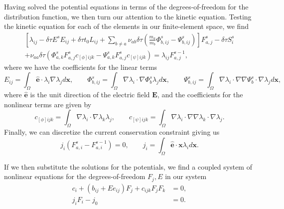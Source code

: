 \documentclass[preprint]{revtex4}
\begin{document}
Having solved the potential equations in terms of the degrees-of-freedom for the distribution function, we then turn our attention to the kinetic equation. Testing the kinetic equation for each of the elements in our finite-element space, we find 
\begin{multline}
\left[\lambda_{ij}-\delta\tau E^sE_{ij}+\delta\tau t_0L_{ij}+\sum_{b\neq a}\nu_{ab}\delta\tau\left(\frac{m_a}{m_b}\Phi^s_{b,ij}-\Psi^s_{b,ij}\right)\right]F^s_{a,j}-\delta\tau S^s_i\\+\nu_{aa}\delta\tau\left(\Phi^s_{a,k}F^s_{a,j}c_{[\phi]ijk}-\Psi^s_{a,k}F^s_{a,j}c_{[\psi]ijk}\right)=\lambda_{ij}F^{s-1}_{a,j},
\end{multline}
where we have the coefficients for the linear terms
\begin{equation}
E_{ij}=\int_\Omega\bm{\hat{e}}\cdot\lambda_i\nabla\lambda_jd\bm{x},\qquad \Phi^s_{b,ij}=\int_\Omega\nabla\lambda_i\cdot\nabla\Phi^s_{b}\lambda_jd\bm{x},\qquad \Psi^s_{b,ij}=\int_\Omega\nabla\lambda_i\cdot\nabla\nabla\Psi^s_{b}\cdot\nabla\lambda_jd\bm{x},
\end{equation}
where $\bm{\hat{e}}$ is the unit direction of the electric field $\bm{E}$, and the coefficients for the nonlinear terms are given by
\begin{equation}
c_{[\phi]ijk}=\int_\Omega\nabla\lambda_i\cdot\nabla\lambda_k\lambda_j,\qquad c_{[\psi]ijk}=\int_\Omega\nabla\lambda_i\cdot\nabla\nabla\lambda_k\cdot\nabla\lambda_j.
\end{equation}
Finally, we can discretize the current conservation constraint giving us
\begin{equation}
j_i(F^s_{a,i}-F^{s-1}_{a,i})=0,\qquad j_i=\int_\Omega\bm{\hat{e}}\cdot\bm{x}\lambda_id\bm{x}.
\end{equation}

If we then substitute the solutions for the potentials, we find a coupled system of nonlinear equations for the degrees-of-freedom $F_j,E$ in our system
\begin{align}
c_i+\left(b_{ij}+Ee_{ij}\right)F_j+c_{ijk}F_jF_k&=0,\\
j_iF_i-j_0&=0.
\end{align}



\end{document}
